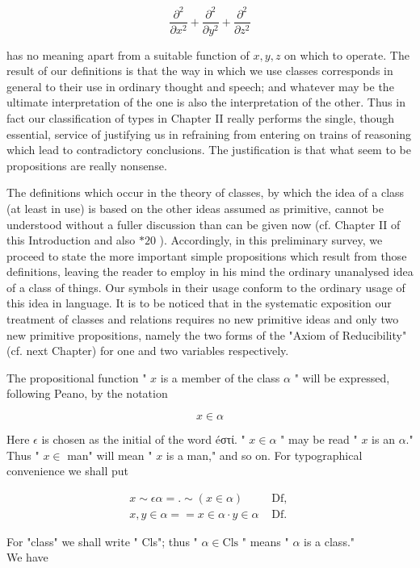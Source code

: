 \documentclass[10pt]{article}
\begin{document}
$$
\frac{\partial^{2}}{\partial x^{2}}+\frac{\partial^{2}}{\partial y^{2}}+\frac{\partial^{2}}{\partial z^{2}}
$$

has no meaning apart from a suitable function of $x, y, z$ on which to operate. The result of our definitions is that the way in which we use classes corresponds in general to their use in ordinary thought and speech; and whatever may be the ultimate interpretation of the one is also the interpretation of the other. Thus in fact our classification of types in Chapter II really performs the single, though essential, service of justifying us in refraining from entering on trains of reasoning which lead to contradictory conclusions. The justification is that what seem to be propositions are really nonsense.

The definitions which occur in the theory of classes, by which the idea of a class (at least in use) is based on the other ideas assumed as primitive, cannot be understood without a fuller discussion than can be given now (cf. Chapter II of this Introduction and also $* 20$ ). Accordingly, in this preliminary survey, we proceed to state the more important simple propositions which result from those definitions, leaving the reader to employ in his mind the ordinary unanalysed idea of a class of things. Our symbols in their usage conform to the ordinary usage of this idea in language. It is to be noticed that in the systematic exposition our treatment of classes and relations requires no new primitive ideas and only two new primitive propositions, namely the two forms of the "Axiom of Reducibility" (cf. next Chapter) for one and two variables respectively.

The propositional function " $x$ is a member of the class $\alpha$ " will be expressed, following Peano, by the notation

$$
x \in \alpha
$$

Here $\epsilon$ is chosen as the initial of the word éστί. " $x \in \alpha$ " may be read " $x$ is an $\alpha$." Thus " $x \in$ man" will mean " $x$ is a man," and so on. For typographical convenience we shall put

$$
\begin{array}{ll}
x \sim \epsilon \alpha=. \sim(x \in \alpha) & \text { Df, } \\
x, y \in \alpha==x \in \alpha \cdot y \in \alpha & \text { Df. }
\end{array}
$$

For "class" we shall write " Cls"; thus " $\alpha \in \mathrm{Cls}$ " means " $\alpha$ is a class."\\
We have
\end{document}
